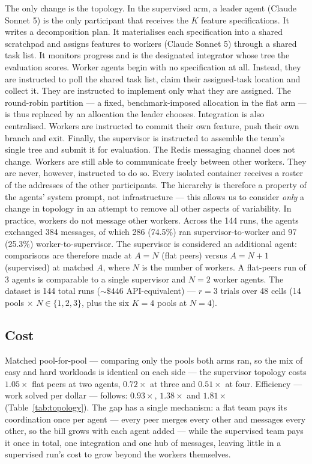\documentclass[11pt,a4paper]{article}
\begin{document}
The only change is the topology. In the supervised arm, a leader agent (Claude Sonnet 5) is the only participant that receives the $K$ feature specifications. It writes a decomposition plan. It materialises each specification into a shared scratchpad and assigns features to workers (Claude Sonnet 5) through a shared task list. It monitors progress and is the designated integrator whose tree the evaluation scores. Worker agents begin with no specification at all. Instead, they are instructed to poll the shared task list, claim their assigned-task location and collect it. They are instructed to implement only what they are assigned. The round-robin partition --- a fixed, benchmark-imposed allocation in the flat arm --- is thus replaced by an allocation the leader chooses. Integration is also centralised. Workers are instructed to commit their own feature, push their own branch and exit. Finally, the supervisor is instructed to assemble the team's single tree and submit it for evaluation. The Redis messaging channel does not change. Workers are still able to communicate freely between other workers. They are never, however, instructed to do so. Every isolated container receives a roster of the addresses of the other participants. The hierarchy is therefore a property of the agents' system prompt, not infrastructure --- this allows us to consider \emph{only} a change in topology in an attempt to remove all other aspects of variability. In practice, workers do not message other workers. Across the 144 runs, the agents exchanged 384 messages, of which 286 (74.5\%) ran supervisor-to-worker and 97 (25.3\%) worker-to-supervisor. The supervisor is considered an additional agent: comparisons are therefore made at $A = N$ (flat peers) versus $A = N + 1$ (supervised) at matched $A$, where $N$ is the number of workers. A flat-peers run of 3 agents is comparable to a single supervisor and $N = 2$ worker agents. The dataset is 144 total runs (${\sim}\$446$ API-equivalent) --- $r = 3$ trials over 48 cells (14 pools $\times$ $N \in \{1, 2, 3\}$, plus the six $K = 4$ pools at $N = 4$).

\subsection{Cost}\label{sec:supcost}

Matched pool-for-pool --- comparing only the pools both arms ran, so the mix of easy and hard workloads is identical on each side --- the supervisor topology costs $1.05\times$ flat peers at two agents, $0.72\times$ at three and $0.51\times$ at four. Efficiency --- work solved per dollar --- follows: $0.93\times$, $1.38\times$ and $1.81\times$ (Table~\ref{tab:topology}). The gap has a single mechanism: a flat team pays its coordination once per agent --- every peer merges every other and messages every other, so the bill grows with each agent added --- while the supervised team pays it once in total, one integration and one hub of messages, leaving little in a supervised run's cost to grow beyond the workers themselves.
\end{document}
